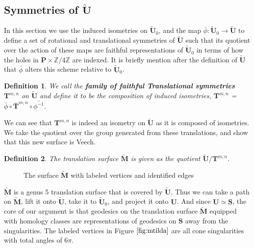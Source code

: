 \documentclass[]{article}
\newtheorem{Def}{Definition}[subsection]
\begin{document}
\subsection{Symmetries of $\tilde{\mathbf{U}}$}
In this section we use the induced isometries on $\tilde{\mathbf{U}}_0$, and the map $\bar{\phi}:\tilde{\mathbf{U}}_0\rightarrow\tilde{\mathbf{U}}$ to define a set of rotational and translational symmetries of $\tilde{\mathbf{U}}$ such that its quotient over the action of these maps are faithful representations of $\tilde{\mathbf{U}}_0$ in terms of how the holes in $\mathbf{P}\times\mathbb{Z}/4\mathbb{Z}$ are indexed. It is briefly mention after the definition of $\tilde{\mathbf{U}}$ that $\bar{\phi}$ alters this scheme relative to $\tilde{\mathbf{U}}_0$. 

\begin{Def}We call the \textbf{family of faithful Translational symmetries} $\mathbf{T}^{m,n}$ on $\tilde{\mathbf{U}}$ and define it to be the composition of induced isometries, $\mathbf{T}^{m,n}$ = $\bar{\phi}\circ\bar{\mathbf{T}}^{m,n}\circ\bar{\phi^{-1}}$.
\end{Def}

We can see that $\mathbf{T}^{m,n}$ is indeed an isometry on $\tilde{\mathbf{U}}$ as it is composed of isometries. We take the quotient over the group generated from these translations, and show that this new surface is Veech. 

\begin{Def}
The translation surface $\tilde{\mathbf{M}}$ is given as the quotient  $\tilde{\mathbf{U}}/\mathbf{T}^{m,n}$.
\end{Def} 

\begin{figure}[H]
\centering

\caption{The surface $\tilde{\mathbf{M}}$ with labeled vertices and identified edges}
\label{fig:mtilda}
\end{figure}

$\tilde{\mathbf{M}}$ is a genus 5 translation surface that is covered by $\tilde{\mathbf{U}}$. Thus we can take a path on $\tilde{\mathbf{M}}$, lift it onto $\tilde{\mathbf{U}}$, take it to $\tilde{\mathbf{U}}_0$, and project it onto $\mathbf U$. And since $\mathbf{U}\simeq\mathbf{S}$, the core of our argument is that geodesics on the translation surface $\tilde{\mathbf{M}}$ equipped with homology classes are representations of geodesics on $\mathbf{S}$ away from the singularities. The labeled vertices in Figure $\ref{fig:mtilda}$ are all cone singularities with total angles of $6\pi$. 
\end{document}
